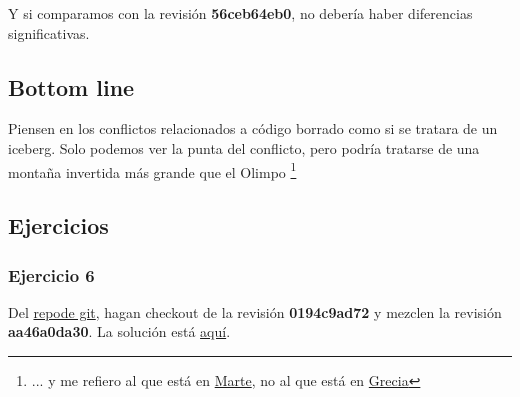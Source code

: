 Y si comparamos con la revisión {\bf 56ceb64eb0}, no debería haber diferencias significativas.

\subsection{Bottom line}
Piensen en los conflictos relacionados a código borrado como si se tratara de un iceberg. Solo podemos ver la
punta del conflicto, pero podría tratarse de una montaña invertida más grande que el Olimpo 
\footnote{... y me refiero al que está en \href{https://es.wikipedia.org/wiki/Monte_Olimpo_(Marte)}{Marte}, no al que está
en \href{https://es.wikipedia.org/wiki/Olimpo}{Grecia}}

\subsection{Ejercicios}
\subsubsection{Ejercicio 6}
Del \hyperref[git_repo]{repode git}, hagan checkout de la revisión {\bf 0194c9ad72} y mezclen la revisión {\bf aa46a0da30}.
La solución está \hyperref[exercise_06]{aquí}.

